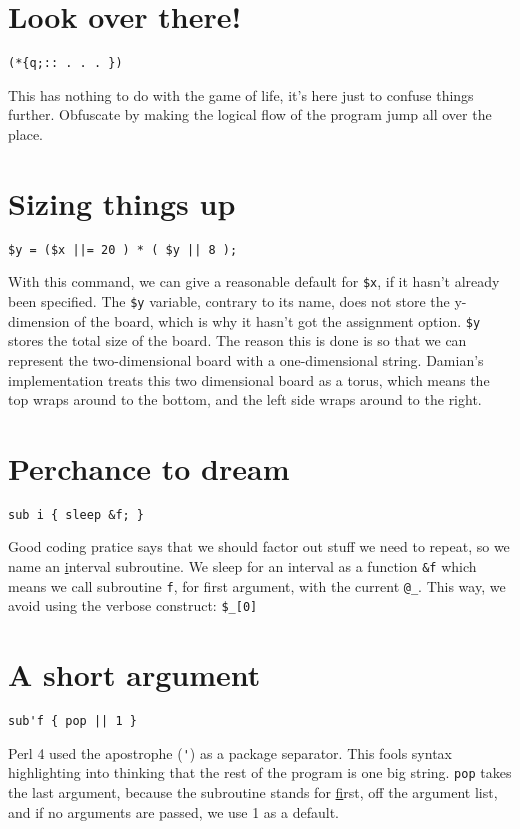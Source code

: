 \documentclass{article}
\begin{document}
\section{Look over there!}
\begin{verbatim}
(*{q;:: . . . })
\end{verbatim}
This has nothing to do with the game of life, it's here just to confuse
things further.  Obfuscate by making the logical flow of the program
jump all over the place.

\section{Sizing things up}
\begin{verbatim}
$y = ($x ||= 20 ) * ( $y || 8 );
\end{verbatim}
With this command, we can give a reasonable default for \verb"$x", if
it hasn't already been
specified.  The \verb"$y" variable, contrary to its name, does not
store the y-dimension of the board, which
is why it hasn't got the assignment option.  \verb"$y" stores the total size
of the board.  The reason this is done is so that we can
represent the two-dimensional board with a one-dimensional string.
Damian's implementation treats this two dimensional board as a torus,
which means the top wraps around to the bottom, and the left side wraps
around to the right.

\section{Perchance to dream}
\begin{verbatim}
sub i { sleep &f; }
\end{verbatim}
Good coding pratice says that we should factor out stuff we need to repeat, 
so we name an \underline{i}nterval subroutine.
We sleep for an interval as a function \verb"&f" which means we call
subroutine \verb"f", for first argument, with
the current \verb"@_".  This way, we avoid using the verbose construct:
\verb"$_[0]"

\section{A short argument}
\begin{verbatim}
sub'f { pop || 1 }
\end{verbatim}
Perl 4 used the apostrophe (\verb"'") as a package separator.  This
fools syntax highlighting into
thinking that the rest of the program is one big string.  \verb"pop" takes the last
argument, because the subroutine stands for \underline{f}irst, off the argument 
list, and if no arguments are passed, we use 1 as a default.
\end{document}

